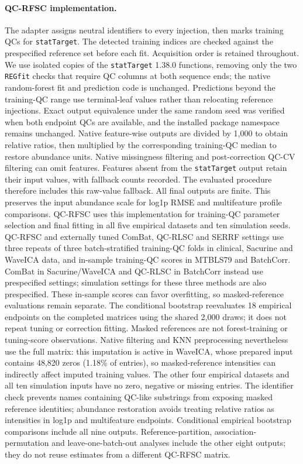 \documentclass[namedate,webpdf,modern,large,nocrop]{oup-authoring-template}
\begin{document}
\paragraph{QC-RFSC implementation.} The adapter assigns neutral identifiers to every injection, then marks training QCs for \texttt{statTarget}. The detected training indices are checked against the prespecified reference set before each fit. Acquisition order is retained throughout. We use isolated copies of the \texttt{statTarget} 1.38.0 functions, removing only the two \texttt{REGfit} checks that require QC columns at both sequence ends; the native random-forest fit and prediction code is unchanged. Predictions beyond the training-QC range use terminal-leaf values rather than relocating reference injections. Exact output equivalence under the same random seed was verified when both endpoint QCs are available, and the installed package namespace remains unchanged. Native feature-wise outputs are divided by 1,000 to obtain relative ratios, then multiplied by the corresponding training-QC median to restore abundance units. Native missingness filtering and post-correction QC-CV filtering can omit features. Features absent from the \texttt{statTarget} output retain their input values, with fallback counts recorded. The evaluated procedure therefore includes this raw-value fallback. All final outputs are finite. This preserves the input abundance scale for log1p RMSE and multifeature profile comparisons. QC-RFSC uses this implementation for training-QC parameter selection and final fitting in all five empirical datasets and ten simulation seeds. QC-RFSC and externally tuned ComBat, QC-RLSC and SERRF settings use three repeats of three batch-stratified training-QC folds in clinical, Sacurine and WaveICA data, and in-sample training-QC scores in MTBLS79 and BatchCorr. ComBat in Sacurine/WaveICA and QC-RLSC in BatchCorr instead use prespecified settings; simulation settings for these three methods are also prespecified. These in-sample scores can favor overfitting, so masked-reference evaluations remain separate. The conditional bootstrap reevaluates 18 empirical endpoints on the completed matrices using the shared 2,000 draws; it does not repeat tuning or correction fitting. Masked references are not forest-training or tuning-score observations. Native filtering and KNN preprocessing nevertheless use the full matrix: this imputation is active in WaveICA, whose prepared input contains 48,820 zeros (1.18\% of entries), so masked-reference intensities can indirectly affect imputed training values. The other four empirical datasets and all ten simulation inputs have no zero, negative or missing entries. The identifier check prevents names containing QC-like substrings from exposing masked reference identities; abundance restoration avoids treating relative ratios as intensities in log1p and multifeature endpoints. Conditional empirical bootstrap comparisons include all nine outputs. Reference-partition, association-permutation and leave-one-batch-out analyses include the other eight outputs; they do not reuse estimates from a different QC-RFSC matrix.
\end{document}
